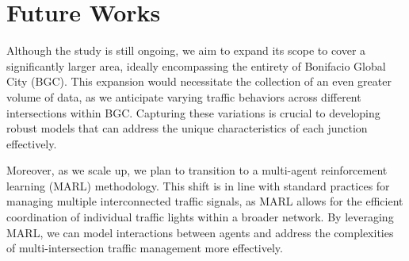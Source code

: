 
\section{Future Works}

Although the study is still ongoing, we aim to expand its scope to cover a significantly larger area, ideally encompassing the entirety of Bonifacio Global City (BGC). This expansion would necessitate the collection of an even greater volume of data, as we anticipate varying traffic behaviors across different intersections within BGC. Capturing these variations is crucial to developing robust models that can address the unique characteristics of each junction effectively.

Moreover, as we scale up, we plan to transition to a multi-agent reinforcement learning (MARL) methodology. This shift is in line with standard practices for managing multiple interconnected traffic signals, as MARL allows for the efficient coordination of individual traffic lights within a broader network. By leveraging MARL, we can model interactions between agents and address the complexities of multi-intersection traffic management more effectively.

